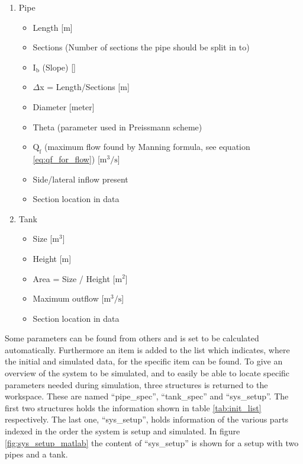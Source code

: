 \begin{enumerate} \label{tab:init_list}
	\item Pipe
	\begin{itemize}
		\item Length [m]
		\item Sections (Number of sections the pipe should be split in to)
		\item $\text{I}_\text{b}$ (Slope) [\textperthousand]
		\item $\Delta$x = Length/Sections [m]
		\item Diameter [meter]
		\item Theta (parameter used in Preissmann scheme)
		\item $\text{Q}_{\text{f}}$ (maximum flow found by Manning formula, see equation \ref{eq:qf_for_flow}) [$\text{m}^\text{3}/\text{s}$]
		\item Side/lateral inflow present 
		\item Section location in data 
	\end{itemize}
	\item Tank
	\begin{itemize}
		\item Size [$\text{m}^\text{3}$]
		\item Height [m]
		\item Area = Size / Height [$\text{m}^\text{2}$]
		\item Maximum outflow [$\text{m}^\text{3}/\text{s}$]
		\item Section location in data 
	\end{itemize}
\end{enumerate}

Some parameters can be found from others and is set to be calculated automatically. 
Furthermore an item is added to the list which indicates, where the initial and simulated data, for the specific item can be found.
To give an overview of the system to be simulated, and to easily be able to locate specific parameters needed during simulation, three structures is returned to the workspace. These are named ``pipe\_spec'', ``tank\_spec'' and ``sys\_setup''. The first two structures holds the information shown in table \ref{tab:init_list} respectively. The last one, ``sys\_setup'', holds information of the various parts indexed in the order the system is setup and simulated. In figure \ref{fig:sys_setup_matlab} the content of ``sys\_setup'' is shown for a setup with two pipes and a tank.

